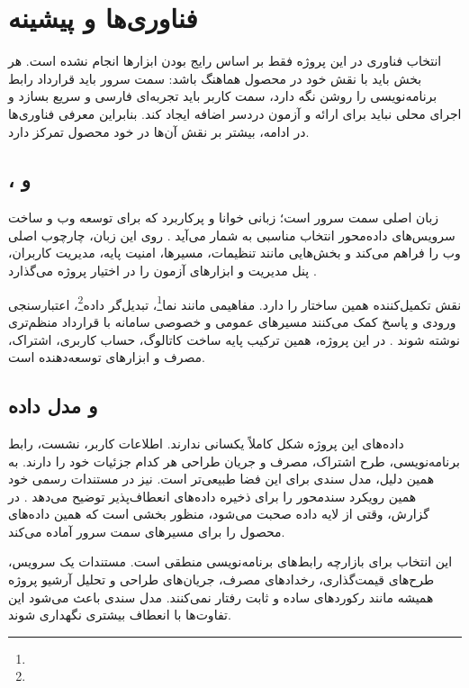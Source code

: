 \chapter{فناوری‌ها و پیشینه}

انتخاب فناوری در این پروژه فقط بر اساس رایج بودن ابزارها انجام نشده است. هر بخش باید با نقش خود در محصول هماهنگ باشد: سمت سرور باید قرارداد رابط برنامه‌نویسی را روشن نگه دارد، سمت کاربر باید تجربه‌ای فارسی و سریع بسازد و اجرای محلی نباید برای ارائه و آزمون دردسر اضافه ایجاد کند. بنابراین معرفی فناوری‌ها در ادامه، بیشتر بر نقش آن‌ها در خود محصول تمرکز دارد.

\section{،  و }
 زبان اصلی سمت سرور است؛ زبانی خوانا و پرکاربرد که برای توسعه وب و ساخت سرویس‌های داده‌محور انتخاب مناسبی به شمار می‌آید \cite{python}. روی این زبان،  چارچوب اصلی وب را فراهم می‌کند و بخش‌هایی مانند تنظیمات، مسیرها، امنیت پایه، مدیریت کاربران، پنل مدیریت و ابزارهای آزمون را در اختیار پروژه می‌گذارد \cite{django}.

 نقش تکمیل‌کننده همین ساختار را دارد. مفاهیمی مانند نما\footnote{}، تبدیل‌گر داده\footnote{}، اعتبارسنجی ورودی و پاسخ  کمک می‌کنند مسیرهای عمومی و خصوصی سامانه با قرارداد منظم‌تری نوشته شوند \cite{drf}. در این پروژه، همین ترکیب پایه ساخت کاتالوگ، حساب کاربری، اشتراک، مصرف و ابزارهای توسعه‌دهنده است.

\section{ و مدل داده}
داده‌های این پروژه شکل کاملاً یکسانی ندارند. اطلاعات کاربر، نشست، رابط برنامه‌نویسی، طرح اشتراک، مصرف و جریان طراحی هر کدام جزئیات خود را دارند. به همین دلیل، مدل سندی برای این فضا طبیعی‌تر است.  نیز در مستندات رسمی خود همین رویکرد سندمحور را برای ذخیره داده‌های انعطاف‌پذیر توضیح می‌دهد \cite{mongodb}. در گزارش، وقتی از لایه داده صحبت می‌شود، منظور بخشی است که همین داده‌های محصول را برای مسیرهای سمت سرور آماده می‌کند.

این انتخاب برای بازارچه رابط‌های برنامه‌نویسی منطقی است. مستندات یک سرویس، طرح‌های قیمت‌گذاری، رخدادهای مصرف، جریان‌های طراحی و تحلیل آرشیو پروژه همیشه مانند رکوردهای ساده و ثابت رفتار نمی‌کنند. مدل سندی باعث می‌شود این تفاوت‌ها با انعطاف بیشتری نگهداری شوند.

